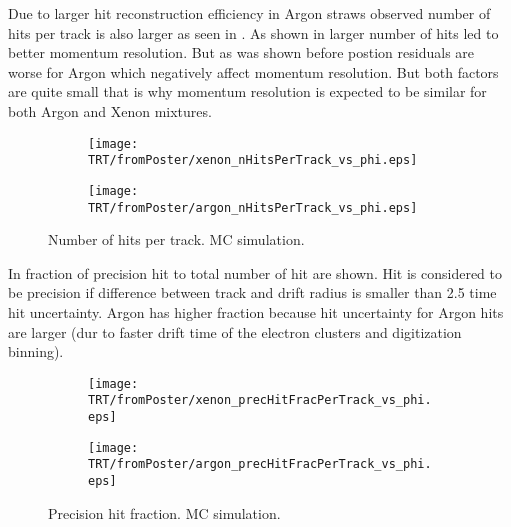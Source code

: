 
Due to larger hit reconstruction efficiency in Argon straws observed number of hits per track is also larger as seen in . 
As shown in  larger number of hits led to better momentum resolution. But as was shown before postion residuals are
worse for Argon which negatively affect momentum resolution. But both factors are quite small that is why momentum resolution is expected to be similar for
both Argon and Xenon mixtures.

\begin{figure}

\begin{subfigure}{.5\textwidth}
  \centering
  \texttt{[image: TRT/fromPoster/xenon\_nHitsPerTrack\_vs\_phi.eps]}
\end{subfigure}%
\begin{subfigure}{.5\textwidth}
  \centering
  \texttt{[image: TRT/fromPoster/argon\_nHitsPerTrack\_vs\_phi.eps]}
\end{subfigure}

\caption{Number of hits per track. MC simulation.}
  \label{fig:nHitsPerTrack}
\end{figure}

In  fraction of precision hit to total number of hit are shown. Hit is considered to be precision
if difference between track and drift radius is smaller than 2.5 time hit uncertainty. Argon has higher fraction because hit uncertainty
for Argon hits are larger (dur to faster drift time of the electron clusters and digitization binning). 

\begin{figure}

\begin{subfigure}{.5\textwidth}
  \centering
  \texttt{[image: TRT/fromPoster/xenon\_precHitFracPerTrack\_vs\_phi.eps]}
\end{subfigure}%
\begin{subfigure}{.5\textwidth}
  \centering
  \texttt{[image: TRT/fromPoster/argon\_precHitFracPerTrack\_vs\_phi.eps]}
\end{subfigure}

\caption{Precision hit fraction. MC simulation.}
  \label{fig:precHitFracPerTrack}
\end{figure}


